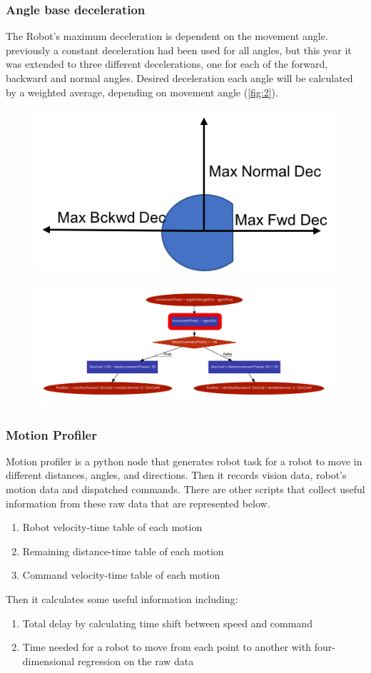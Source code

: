 \documentclass{llncs}
\begin{document}
\subsubsection{Angle base deceleration}
The Robot’s maximum deceleration is dependent on the movement angle. previously a constant deceleration had been used for all angles, but this year it was extended to three different decelerations, one for each of the forward, backward and normal angles. Desired deceleration each angle will be calculated by a weighted average, depending on movement angle (\cref{fig:2}).
\begin{figure}
\centering
\includegraphics[width=.5\linewidth]{f2}
\label{fig:2}
\caption{}
\centering
\centering
\includegraphics[width=\linewidth]{f3}
\label{fig:3}
\caption{}
\end{figure}
\subsubsection{Motion Profiler}
Motion profiler is a python node that generates robot task for a robot to move in different distances, angles, and directions. Then it records vision data, robot’s motion data and dispatched commands. There are other scripts that collect useful information from these raw data that are represented below.
\begin{enumerate}  
\item Robot velocity-time table of each motion
\item Remaining distance-time table of each motion
\item  Command velocity-time table of each motion
\end{enumerate}
Then it calculates some useful information including:
\begin{enumerate}  
\item Total delay by calculating time shift between speed and command 
\item Time needed for a robot to move from each point to another with four-dimensional regression on the raw data
\end{enumerate}
\end{document}
